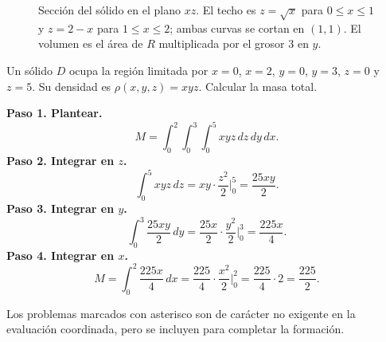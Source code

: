 \begin{figure}[!htbp]
\centering
{}
\caption{Sección del sólido en el plano $xz$. El techo es $z=\sqrt x$ para
  $0\le x\le1$ y $z=2-x$ para $1\le x\le2$; ambas curvas se cortan en
  $(1,1)$. El volumen es el área de $R$ multiplicada por el grosor $3$ en $y$.}
\label{fig:solido_techo}
\end{figure}



\begin{prob}
Un sólido \(D\) ocupa la región limitada por \(x=0\), \(x=2\), \(y=0\), \(y=3\), \(z=0\) y \(z=5\). Su densidad es \(\rho(x,y,z) = xyz\). Calcular la masa total.
\begin{myproof}
\textbf{Paso 1. Plantear.}
\[
M = \int_0^2\int_0^3\int_0^5 xyz\,dz\,dy\,dx.
\]
\textbf{Paso 2. Integrar en $z$.}
\[
\int_0^5 xyz\,dz = xy\cdot\frac{z^2}{2}\Big|_0^5 = \frac{25xy}{2}.
\]
\textbf{Paso 3. Integrar en $y$.}
\[
\int_0^3 \frac{25xy}{2}\,dy = \frac{25x}{2}\cdot\frac{y^2}{2}\Big|_0^3 = \frac{225x}{4}.
\]
\textbf{Paso 4. Integrar en $x$.}
\[
M = \int_0^2 \frac{225x}{4}\,dx
= \frac{225}{4}\cdot\frac{x^2}{2}\Big|_0^2 = \frac{225}{4}\cdot 2 = \boxed{\dfrac{225}{2}}.
\]
\end{myproof}
\end{prob}







\begin{rem}
Los problemas marcados con asterisco son de carácter no exigente en la evaluación coordinada, pero se incluyen para completar la formación.
\end{rem}


